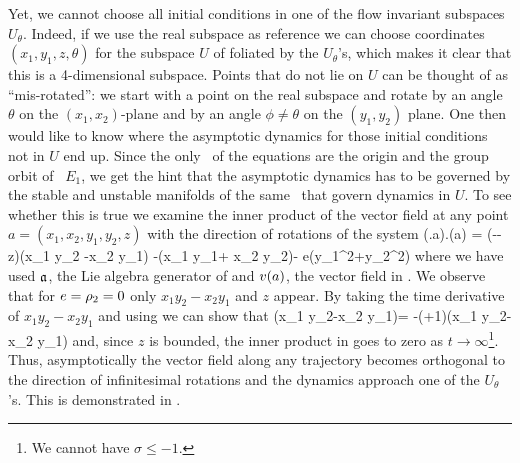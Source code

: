 Yet, we cannot choose all initial conditions
in one of the flow invariant subspaces $U_\theta$. Indeed, if we use the real subspace
as reference we can choose coordinates $(x_1,y_1,z,\theta)$ for the subspace $U$ of 
foliated by the $U_\theta$'s, which makes it clear that this is a 4-dimensional subspace.
Points that do not lie on $U$ can be thought of as ``mis-rotated'': we start with a point on
the real subspace and rotate by an angle $\theta$ on the $(x_1,x_2)$-plane and by an
angle $\phi\neq\theta$ on the $(y_1,y_2)$ plane. One then would like to know where the asymptotic dynamics
for those initial conditions not in $U$ end up. Since the only \eqva\ of the equations are the origin
and the group orbit of \eqv\ $E_1$, we get the hint that the asymptotic dynamics has to be governed
by the stable and unstable manifolds of the same \eqva\ that govern dynamics in $U$.
To see whether this is true we examine the inner product of the vector field at any point  $a=(x_1,x_2,y_1,y_2,z)$  with the direction of
rotations of the system
\beq
	(\Lg.a).\vf(a) = \left(\RerCLor-\sigma-z\right)\left(x_1 y_2 -x_2 y_1\right) -\ImrCLor\left(x_1 y_1+ x_2 y_2\right)- e\left(y_1^2+y_2^2\right)
	\label{eq:CLe0ip}
\eeq
where we have used $\mathfrak{a}$, the Lie algebra generator  of  and $v(a)$, the vector field in .
We observe that for $e=\rho_2=0$ only $x_1 y_2-x_2 y_1$ and $z$ appear. By taking the time derivative of $x_1 y_2-x_2 y_1$ and using 
we can show that
\beq
	\left(x_1 y_2-x_2 y_1\right)= -(\sigma+1)\left(x_1 y_2-x_2 y_1\right)
\eeq
and, since $z$ is bounded, the inner product in  goes to zero as $t\rightarrow\infty$\footnote{We cannot have $\sigma\leq -1$.}. Thus, asymptotically the vector
field along any trajectory becomes orthogonal to the direction of infinitesimal rotations and the dynamics approach one of the $U_\theta$'s.
This is demonstrated in .


